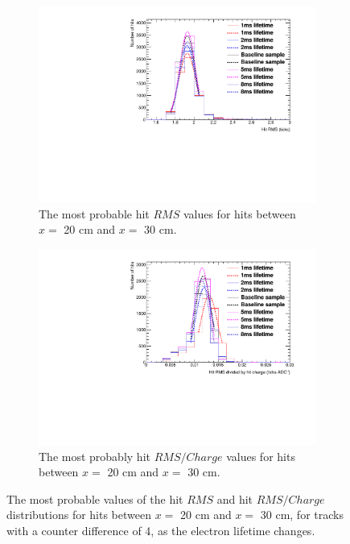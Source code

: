 \begin{figure}[h!]
  \centering
  \begin{subfigure}{0.45\textwidth}
    \centering
    \includegraphics[width=\textwidth]{Canvas_RMS_20cm_ElecLifetime}
    \caption{The most probable hit $RMS$ values for hits between $x =$ 20 cm and $x =$ 30 cm.}
  \end{subfigure}
  \hspace{0.08\textwidth}
  \begin{subfigure}{0.45\textwidth}
    \centering
    \includegraphics[width=\textwidth]{Canvas_RMS_Q_20cm_ElecLifetime}
    \caption{The most probably hit $RMS/Charge$ values for hits between $x =$ 20 cm and $x =$ 30 cm.}
  \end{subfigure}
  \caption[The most probable values of the hit $RMS$ and hit $RMS/Charge$ distributions for tracks with a counter difference of 4, as the electron lifetime changes]
          {The most probable values of the hit $RMS$ and hit $RMS/Charge$ distributions for hits between $x =$ 20 cm and $x =$ 30 cm, for tracks with a counter difference of 4, as the electron lifetime changes.}
  \label{fig:DiffLifeStudy_HitFit}
\end{figure}

